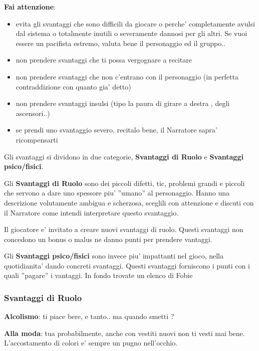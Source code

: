 \documentclass[a4paper,11pt,twoside,openany]{book}
\begin{document}
{\textbf{Fai attenzione}:

\begin{itemize}
\item 
evita gli svantaggi che sono difficili da giocare o perche' completamente avulsi dal sistema o totalmente inutili o severamente dannosi per gli altri. Se vuoi essere un pacifista estremo, valuta bene il personaggio ed il gruppo.. 
\item 
non prendere svantaggi che ti possa vergognare a recitare 
\item 
non prendere svantaggi che non c'entrano con il personaggio (in perfetta contraddizione con quanto gia' detto) 
\item 
non prendere svantaggi insulsi (tipo la paura di girare a destra , degli ascensori..) 
\item 
se prendi uno svantaggio severo, recitalo bene, il Narratore sapra' ricompensarti 
\end{itemize}

Gli svantaggi si dividono in due categorie, \textbf{Svantaggi di Ruolo} e \textbf{Svantaggi psico/fisici}. 

Gli \textbf{Svantaggi di Ruolo} sono dei piccoli difetti, tic, problemi grandi e piccoli che servono a dare uno spessore piu' ''umano'' al personaggio. Hanno una descrizione volutamente ambigua e scherzosa, sceglili con attenzione e discuti con il Narratore come intendi interpretare questo svantaggio.

Il giocatore e' invitato a creare nuovi svantaggi di ruolo. Questi svantaggi non concedono un bonus o malus ne danno punti per prendere vantaggi.

\bigskip

Gli \textbf{Svantaggi psico/fisici} sono invece piu' impattanti nel gioco, nella quotidianita' dando concreti svantaggi. Questi svantaggi forniscono i punti con i quali ''pagare'' i vantaggi. In fondo trovate un elenco di Fobie

\pagebreak

\subsubsection{Svantaggi di Ruolo}

\bigskip

\textbf{Alcolismo}: ti piace bere, e tanto.. ma quando smetti ?

\textbf{Alla moda}: tua probabilmente, anche con vestiti nuovi non ti vesti mai bene. L'accostamento di colori e' sempre un pugno nell'occhio.

}
\end{document}
